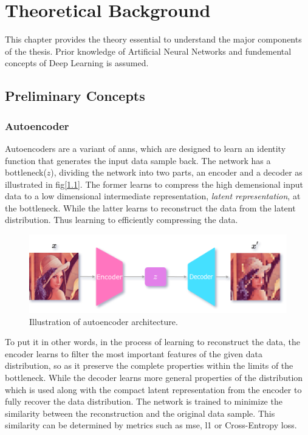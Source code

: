 \chapter{Theoretical Background}
\label{chap:background}

This chapter provides the theory essential to understand the major components of the thesis. Prior knowledge of Artificial Neural Networks \cite{theory_ann_wiki} and fundemental concepts of Deep Learning \cite{theory_dl} is assumed.

\section{Preliminary Concepts}
\label{sec:Preliminary}

\subsection{Autoencoder}
Autoencoders are a variant of \acp{ann}, which are designed to learn an identity function that generates the input data sample back. The network has a bottleneck($z$), dividing the network into two parts, an encoder and a decoder as illustrated in fig[\ref{fig:ae_arch}]. The former learns to compress the high demensional input data to a low dimensional intermediate representation, \textit{latent representation}, at the bottleneck. While the latter learns to reconstruct the data from the latent distribution. Thus learning to efficiently compressing the data.

\begin{figure}[!h]
    \centering
    \includegraphics[scale=0.4]{figures/ae_arch.png}
    \caption{Illustration of autoencoder architecture.}
    \label{fig:ae_arch}
\end{figure}

To put it in other words, in the process of learning to reconstruct the data, the encoder learns to filter the most important features of the given data distribution, so as it preserve the complete properties within the limits of the bottleneck. While the decoder learns more general properties of the distribution which is used along with the compact latent representation from the encoder to fully recover the data distribution. The network is trained to minimize the similarity between the reconstruction and the original data sample. This similarity can be determined by metrics such as \ac{mse}, \ac{l1} or Cross-Entropy loss.

